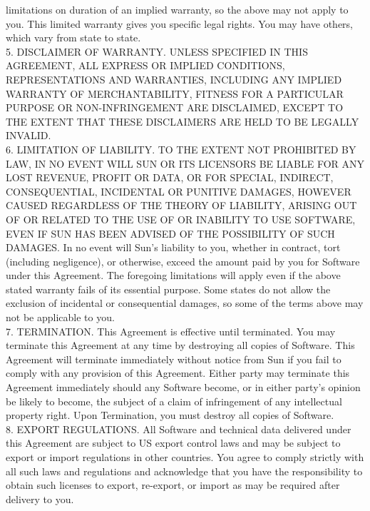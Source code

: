 {   limitations on duration of an implied warranty, so the above may
   not apply to you. This limited warranty gives you specific legal
   rights. You may have others, which vary from state to state.
\\[4pt]
   5. DISCLAIMER OF WARRANTY. UNLESS SPECIFIED IN THIS AGREEMENT, ALL
   EXPRESS OR IMPLIED CONDITIONS, REPRESENTATIONS AND WARRANTIES,
   INCLUDING ANY IMPLIED WARRANTY OF MERCHANTABILITY, FITNESS FOR A
   PARTICULAR PURPOSE OR NON-INFRINGEMENT ARE DISCLAIMED, EXCEPT TO
   THE EXTENT THAT THESE DISCLAIMERS ARE HELD TO BE LEGALLY INVALID.
\\[4pt]
   6. LIMITATION OF LIABILITY. TO THE EXTENT NOT PROHIBITED BY LAW, IN
   NO EVENT WILL SUN OR ITS LICENSORS BE LIABLE FOR ANY LOST REVENUE,
   PROFIT OR DATA, OR FOR SPECIAL, INDIRECT, CONSEQUENTIAL, INCIDENTAL
   OR PUNITIVE DAMAGES, HOWEVER CAUSED REGARDLESS OF THE THEORY OF
   LIABILITY, ARISING OUT OF OR RELATED TO THE USE OF OR INABILITY TO
   USE SOFTWARE, EVEN IF SUN HAS BEEN ADVISED OF THE POSSIBILITY OF
   SUCH DAMAGES. In no event will Sun's liability to you, whether in
   contract, tort (including negligence), or otherwise, exceed the
   amount paid by you for Software under this Agreement. The foregoing
   limitations will apply even if the above stated warranty fails of
   its essential purpose. Some states do not allow the exclusion of
   incidental or consequential damages, so some of the terms above may
   not be applicable to you.
\\[4pt]
   7. TERMINATION. This Agreement is effective until terminated. You
   may terminate this Agreement at any time by destroying all copies
   of Software. This Agreement will terminate immediately without
   notice from Sun if you fail to comply with any provision of this
   Agreement. Either party may terminate this Agreement immediately
   should any Software become, or in either party's opinion be likely
   to become, the subject of a claim of infringement of any
   intellectual property right. Upon Termination, you must destroy all
   copies of Software.
\\[4pt]
   8. EXPORT REGULATIONS. All Software and technical data delivered
   under this Agreement are subject to US export control laws and may
   be subject to export or import regulations in other countries. You
   agree to comply strictly with all such laws and regulations and
   acknowledge that you have the responsibility to obtain such
   licenses to export, re-export, or import as may be required after
   delivery to you.
\\[4pt]
}
